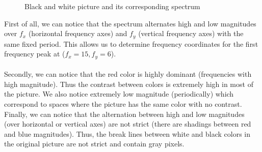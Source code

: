 \documentclass[a4paper]{article}
\begin{document}
         \begin{figure}[!htb]\centering
             \begin{minipage}{0.45\textwidth}  \end{minipage}
             \begin{minipage}{0.45\textwidth}  \end{minipage}
             \caption{Black and white picture and its corresponding spectrum}
             \label{chessBoardAndSpectrum.pgm}
         \end{figure}

         First of all, we can notice that the spectrum alternates high and low magnitudes over $f_{x}$ (horizontal frequency axes) and $f_{y}$ (vertical frequency axes) with the same fixed period.  This allows us to determine frequency coordinates for the first frequency peak at ($f_{x} = 15, f_{y} = 6$).\\\\
         Secondly, we can notice that the red color is highly dominant (frequencies with high magnitude).   Thus the contrast between colors is extremely high in most of the picture.
         We also notice extremely low magnitude (periodically) which correspond to spaces where the picture has the same color with no contrast.   
         Finally, we can notice that the alternation between high and low magnitudes (over horizontal or vertical axes) are not strict (there are shadings between red and blue magnitudes).   
         Thus, the break lines between white and black colors in the original picture are not strict and contain gray pixels.
\end{document}
